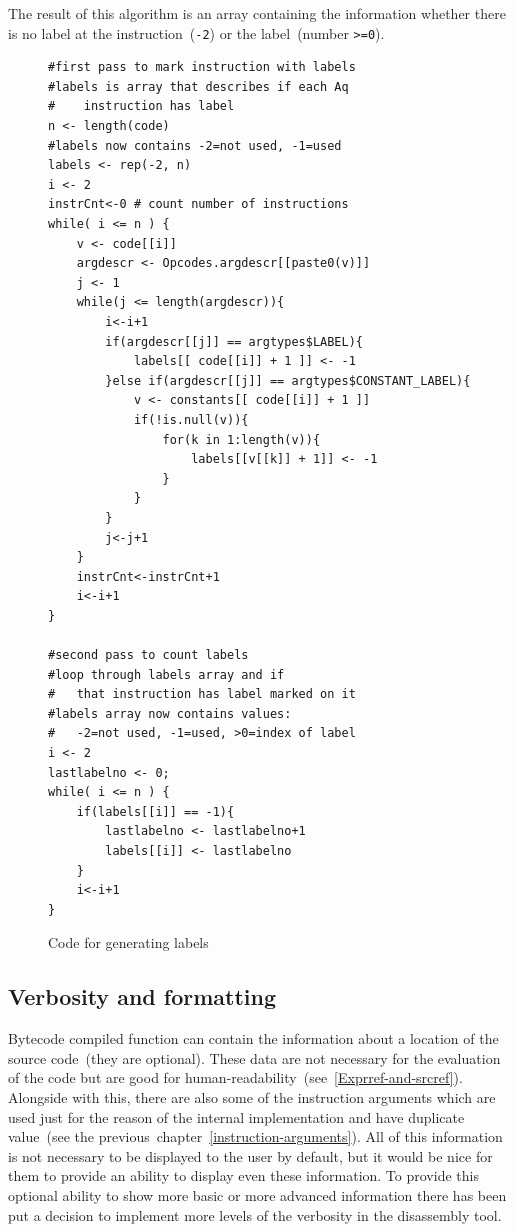 \documentclass[thesis=M,english]{FITthesis}[2018/10/20]
\newcommand{\code}[1]{\texttt{#1}}
\begin{document}
The result of this algorithm is an array containing the information whether there is no label at the instruction~(\code{-2}) or the label~(number \code{>=0}).

\begin{figure}[!h]
\begin{lstlisting}
#first pass to mark instruction with labels
#labels is array that describes if each	Aq
#    instruction has label
n <- length(code)
#labels now contains -2=not used, -1=used
labels <- rep(-2, n)
i <- 2
instrCnt<-0 # count number of instructions
while( i <= n ) {
    v <- code[[i]]
    argdescr <- Opcodes.argdescr[[paste0(v)]]
    j <- 1
    while(j <= length(argdescr)){
        i<-i+1
        if(argdescr[[j]] == argtypes$LABEL){
            labels[[ code[[i]] + 1 ]] <- -1
        }else if(argdescr[[j]] == argtypes$CONSTANT_LABEL){
            v <- constants[[ code[[i]] + 1 ]]
            if(!is.null(v)){
                for(k in 1:length(v)){
                    labels[[v[[k]] + 1]] <- -1
                }
            }
        }
        j<-j+1
    }
    instrCnt<-instrCnt+1
    i<-i+1
}

#second pass to count labels
#loop through labels array and if
#   that instruction has label marked on it
#labels array now contains values:
#   -2=not used, -1=used, >0=index of label
i <- 2
lastlabelno <- 0;
while( i <= n ) {
    if(labels[[i]] == -1){
        lastlabelno <- lastlabelno+1
        labels[[i]] <- lastlabelno
    }
    i<-i+1
}
\end{lstlisting}
	\caption{Code for generating labels}\label{fig:code-generating-labels}
\end{figure}

\subsection{Verbosity and formatting}

Bytecode compiled function can contain the information about a location of the source code~(they are optional).  These data are not necessary for the evaluation of the code but are good for human-readability~(see~\ref{Exprref-and-srcref}). Alongside with this, there are also some of the instruction arguments which are used just for the reason of the internal implementation and have duplicate value~(see the previous~chapter~\ref{instruction-arguments}). All of this information is not necessary to be displayed to the user by default, but it would be nice for them to provide an ability to display even these information. To provide this optional ability to show more basic or more advanced information there has been put a decision to implement more levels of the verbosity in the disassembly tool.
\end{document}
